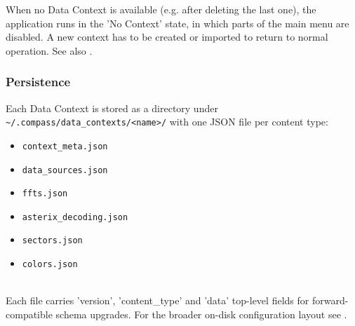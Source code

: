 When no Data Context is available (e.g. after deleting the last one), the application runs in the 'No Context' state, in which parts of the main menu are disabled. A new context has to be created or imported to return to normal operation. See also . \\

\subsubsection{Persistence}

Each Data Context is stored as a directory under \texttt{\textasciitilde/.compass/data\_contexts/<name>/} with one JSON file per content type:

\begin{itemize}
\item \texttt{context\_meta.json}
\item \texttt{data\_sources.json}
\item \texttt{ffts.json}
\item \texttt{asterix\_decoding.json}
\item \texttt{sectors.json}
\item \texttt{colors.json}
\end{itemize}
\ \\

Each file carries 'version', 'content\_type' and 'data' top-level fields for forward-compatible schema upgrades. For the broader on-disk configuration layout see .
